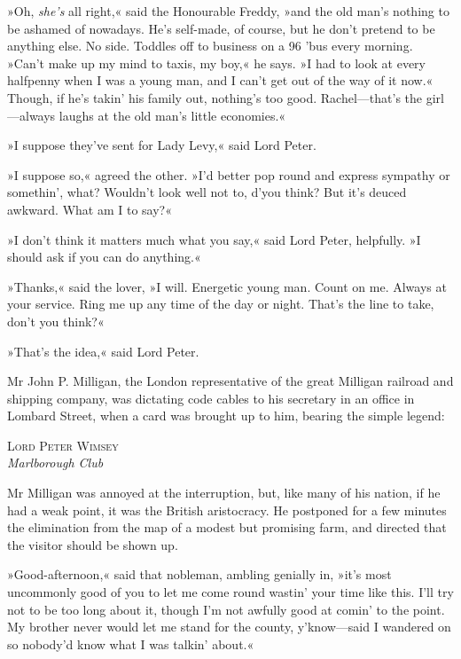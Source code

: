 »Oh, \textit{she's} all right,« said the Honourable Freddy, »and the old man's nothing to be ashamed of nowadays. He's self-made, of course, but he don't pretend to be anything else. No side. Toddles off to business on a 96 'bus every morning. »Can't make up my mind to taxis, my boy,« he says. »I had to look at every halfpenny when I was a young man, and I can't get out of the way of it now.« Though, if he's takin' his family out, nothing's too good. Rachel\allowbreak---\allowbreak that's the girl\allowbreak---\allowbreak always laughs at the old man's little economies.«

»I suppose they've sent for Lady Levy,« said Lord Peter.

»I suppose so,« agreed the other. »I'd better pop round and express sympathy or somethin', what? Wouldn't look well not to, d'you think? But it's deuced awkward. What am I to say?«

»I don't think it matters much what you say,« said Lord Peter, helpfully. »I should ask if you can do anything.«

»Thanks,« said the lover, »I will. Energetic young man. Count on me. Always at your service. Ring me up any time of the day or night. That's the line to take, don't you think?«

»That's the idea,« said Lord Peter.

Mr John P. Milligan, the London representative of the great Milligan railroad and shipping company, was dictating code cables to his secretary in an office in Lombard Street, when a card was brought up to him, bearing the simple legend:

\begin{center}
\textsc{Lord Peter Wimsey}\\
\textit{Marlborough Club}
\end{center}

Mr Milligan was annoyed at the interruption, but, like many of his nation, if he had a weak point, it was the British aristocracy. He postponed for a few minutes the elimination from the map of a modest but promising farm, and directed that the visitor should be shown up.

»Good-afternoon,« said that nobleman, ambling genially in, »it's most uncommonly good of you to let me come round wastin' your time like this. I'll try not to be too long about it, though I'm not awfully good at comin' to the point. My brother never would let me stand for the county, y'know\allowbreak---\allowbreak said I wandered on so nobody'd know what I was talkin' about.«

